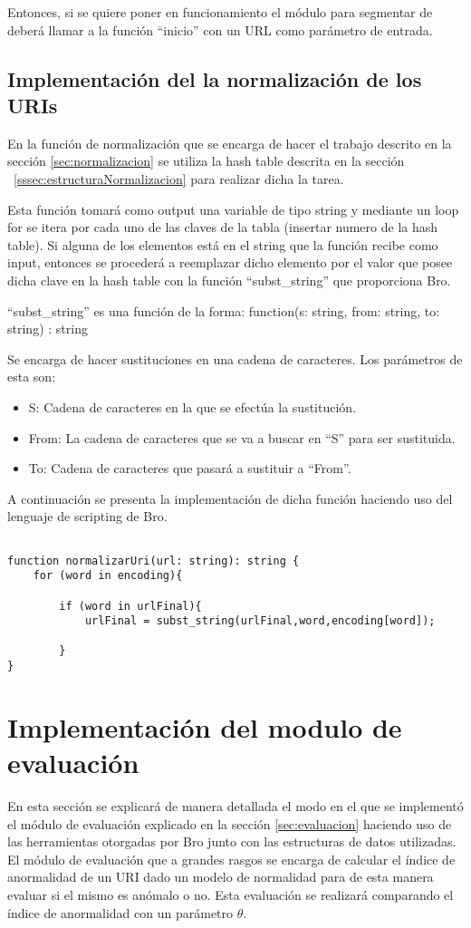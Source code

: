     Entonces, si se quiere poner en funcionamiento el módulo para segmentar de deberá llamar a la función “inicio” con un URL como parámetro de entrada.

\subsection{Implementación del la normalización de los URIs}

En la función de normalización que se encarga de hacer el trabajo descrito en la sección \ref{sec:normalizacion} se utiliza la hash table descrita en la sección ~\ref{sssec:estructuraNormalizacion} para realizar dicha la tarea.

Esta función tomará como output una variable de tipo string y mediante un loop for se itera por cada uno de las claves de la tabla (insertar numero de la hash table). Si alguna de los elementos está en el string que la función recibe como input, entonces se procederá a reemplazar dicho elemento por el valor que posee dicha clave en la hash table con la función “subst\_string” que proporciona Bro.

“subst\_string” es una función de la forma: function(s: string, from: string, to: string) : string

Se encarga de hacer sustituciones en una cadena de caracteres. Los parámetros de esta son:

\begin{itemize}
\item S: Cadena de caracteres en la que se efectúa la sustitución.
\item From: La cadena de caracteres que se va a buscar en “S” para ser sustituida.
\item To: Cadena de caracteres que pasará a sustituir a “From”.
\end{itemize}

A continuación se presenta la implementación de dicha función haciendo uso del lenguaje de scripting de Bro.

\begin{verbatim}

function normalizarUri(url: string): string {
    for (word in encoding){

        if (word in urlFinal){
            urlFinal = subst_string(urlFinal,word,encoding[word]);

        }
}
\end{verbatim}
        
\section{Implementación del modulo de evaluación}
En esta sección se explicará de manera detallada el modo en el que se implementó el módulo de evaluación explicado en la sección \ref{sec:evaluacion}  haciendo uso de las herramientas otorgadas por Bro junto con las estructuras de datos utilizadas. El módulo de evaluación que a grandes rasgos se encarga de calcular el índice de anormalidad de un URI dado un modelo de normalidad para de esta manera evaluar si el mismo es anómalo o no. Esta evaluación se realizará comparando el índice de anormalidad con un parámetro $\theta$.

